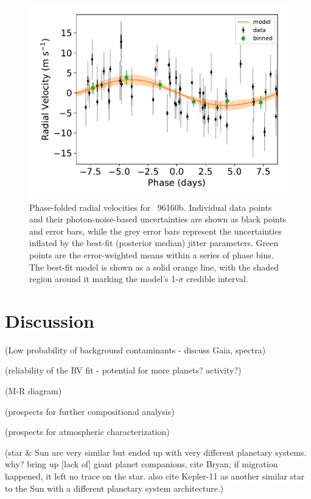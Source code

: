 \documentclass[modern]{aastex62}
\newcommand{\plname}{\acronym{HIP}\ 96160b\xspace}
\begin{document}
\begin{figure}
    \centering
    \includegraphics[width=16cm]{rvphased_1pl_wfwhm}
    \caption{Phase-folded radial velocities for \plname. Individual data points and their photon-noise-based uncertainties are shown as black points and error bars, while the grey error bars represent the uncertainties inflated by the best-fit (posterior median) jitter parameters. Green points are the error-weighted means within a series of phase bins. The best-fit model is shown as a solid orange line, with the shaded region around it marking the model's 1-$\sigma$ credible interval.}
    \label{fig:rv_phased}
\end{figure}


\section{Discussion}
\label{s:discussion}


(Low probability of background contaminants - discuss Gaia, spectra)

(reliability of the RV fit - potential for more planets? activity?)

(M-R diagram)

(prospects for further compositional analysis)

(prospects for atmospheric characterization)

(star \& Sun are very similar but ended up with very different planetary systems. why? bring up [lack of] giant planet companions, cite Bryan; if migration happened, it left no trace on the star. also cite Kepler-11 as another similar star to the Sun with a different planetary system architecture.)
\end{document}
